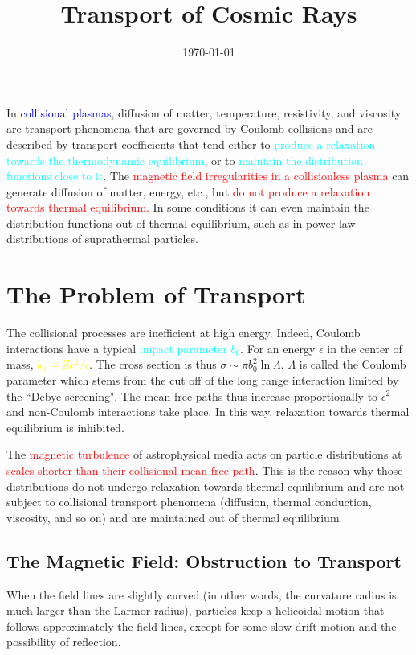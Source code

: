 \documentclass[12pt,a4paper]{article}
\title{Transport of Cosmic Rays}
\author{}
\date{\today}
\begin{document}
\maketitle
In \textcolor{blue}{collisional plasmas}, diffusion of matter, temperature, resistivity, and viscosity are transport phenomena that are governed by Coulomb collisions and are described by transport coefficients that tend either to \textcolor{cyan}{produce a relaxation towards the thermodynamic equilibrium}, or to \textcolor{cyan}{maintain the distribution functions close to it}. The \textcolor{red}{magnetic field irregularities in a collisionless plasma} can generate diffusion of matter, energy, etc., but \textcolor{red}{do not produce a relaxation towards thermal equilibrium.} In some conditions it can even maintain the distribution functions out of thermal equilibrium, such as in power law distributions of suprathermal particles. 

\section{The Problem of Transport}
The collisional processes are inefficient at high energy. Indeed, Coulomb interactions have a typical \textcolor{cyan}{impact parameter $b_0$}. For an energy $\epsilon$ in the center of mass, \textcolor{yellow}{$b_0 = Ze^2/\epsilon$}. The cross section is thus $\sigma \sim \pi b^2_0 \ln \Lambda$. $\Lambda$ is called the Coulomb parameter which stems from the cut off of the long range interaction limited by the ``Debye screening". The mean free paths thus increase proportionally to $\epsilon^2$ and non-Coulomb interactions take place. In this way, relaxation towards thermal equilibrium is inhibited.

The \textcolor{red}{magnetic turbulence} of astrophysical media acts on particle distributions at \textcolor{red}{scales shorter than their collisional mean free path}. This is the reason why those distributions do not undergo relaxation towards thermal equilibrium and are not subject to collisional transport phenomena (diffusion, thermal conduction, viscosity, and so on) and are maintained out of thermal equilibrium.



\subsection{The Magnetic Field: Obstruction to Transport}
When the field lines are slightly curved (in other words, the curvature radius is much larger than the Larmor radius), particles keep a helicoidal motion that follows approximately the field lines, except for some slow drift motion and the possibility of reflection. 
 
\end{document}
